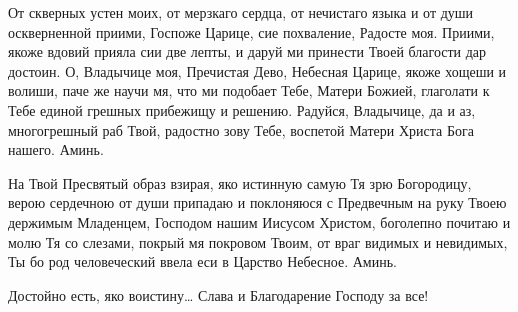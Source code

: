 \begin{mymulticols}
{От скверных устен моих, от мерзкаго сердца, от нечистаго языка и от души оскверненной приими, Госпоже Царице, сие похваление, Радосте моя. Приими, якоже вдовий прияла сии две лепты, и даруй ми принести Твоей благости дар достоин. О, Владычице моя, Пречистая Дево, Небесная Царице, якоже хощеши и волиши, паче же научи мя, что ми подобает Тебе, Матери Божией, глаголати к Тебе единой грешных прибежищу и решению. Радуйся, Владычице, да и аз, многогрешный раб Твой, радостно зову Тебе, воспетой Матери Христа Бога нашего. Аминь.

На Твой Пресвятый образ взирая, яко истинную самую Тя зрю Богородицу, верою сердечною от души припадаю и поклоняюся с Предвечным на руку Твоею держимым Младенцем, Господом нашим Иисусом Христом, боголепно почитаю и молю Тя со слезами, покрый мя покровом Твоим, от враг видимых и невидимых, Ты бо род человеческий ввела еси в Царство Небесное. Аминь.

 Достойно есть, яко воистину… Слава и Благодарение Господу за все!}

\end{mymulticols}

\mychapterending

